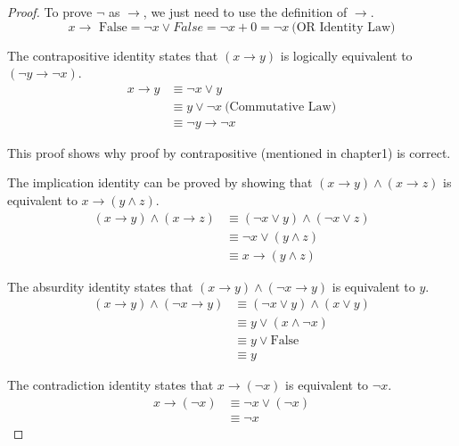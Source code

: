         \begin{proof}
            To prove $\lnot$ as \(\rightarrow\), we just need to use the definition of $
            \rightarrow$.
            $$x\rightarrow\text{ False}= \lnot x \lor False = \lnot x + 0 = \lnot x \ \text{(OR Identity Law)}$$
            
            The contrapositive identity states that \( (x \rightarrow y) \) is logically equivalent to \( (\lnot y \rightarrow \lnot x) \).
            \begin{align*}
            x \rightarrow y &\equiv \lnot x \lor y \\
                &\equiv y \lor \lnot x\ \text{(Commutative Law)}\\
            &\equiv \lnot y \rightarrow \lnot x
            \end{align*}
            \begin{remark}
                This proof shows why proof by contrapositive (mentioned in chapter1) is correct.
            \end{remark}
            The implication identity can be proved by showing that \( (x \rightarrow y) \land (x \rightarrow z) \) is equivalent to \( x \rightarrow (y \land z) \).
            \begin{align*}
            (x \rightarrow y) \land (x \rightarrow z) &\equiv (\lnot x \lor y) \land (\lnot x \lor z) \\
            &\equiv \lnot x \lor (y \land z) \\
            &\equiv x \rightarrow (y \land z)
            \end{align*}

            The absurdity identity states that \( (x \rightarrow y) \land (\lnot x \rightarrow y) \) is equivalent to \( y \).
            \begin{align*}
            (x \rightarrow y) \land (\lnot x \rightarrow y) &\equiv (\lnot x \lor y) \land (x \lor y) \\
            &\equiv y \lor (x \land \lnot x) \\
            &\equiv y \lor \text{False} \\
            &\equiv y
            \end{align*}

            The contradiction identity states that \( x \rightarrow (\lnot x) \) is equivalent to \( \lnot x \).
            \begin{align*}
            x \rightarrow (\lnot x) &\equiv \lnot x \lor (\lnot x) \\
            &\equiv \lnot x
            \end{align*}
        \end{proof}
